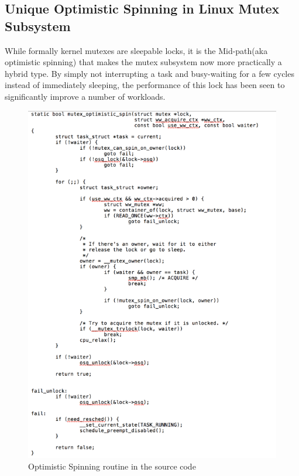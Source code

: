 \documentclass[10pt]{sigplanconf}
\begin{document}
\subsection{Unique Optimistic Spinning in Linux Mutex Subsystem}
While formally kernel mutexes are sleepable locks, it is the Mid-path(aka optimistic spinning) that makes the mutex subsystem now more practically a hybrid type. By simply not interrupting a task and busy-waiting for a few cycles instead of immediately sleeping, the performance of this lock has been seen to significantly improve a number of workloads. \\

\begin{figure}[h!]
	\includegraphics[scale=1]{image02.png}
	\caption{Optimistic Spinning routine in the source code}
\end{figure}

\vspace{50pt}
\end{document}
